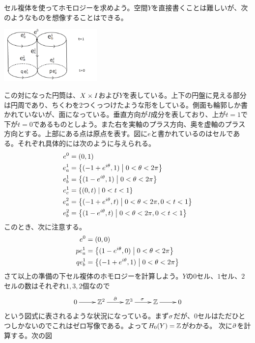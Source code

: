 \subsubsection{} %
\begin{sol}

セル複体を使ってホモロジーを求めよう。空間$Y$を直接書くことは難しいが、次のようなものを想像することはできる。

\begin{center}
\includegraphics[width=5cm]{H31expert05_01.png}
\end{center}

この対になった円筒は、$X \times I$および$Y$を表している。上下の円盤に見える部分は円周であり、ちくわを2つくっつけたような形をしている。側面も輪郭しか書かれていないが、面になっている。垂直方向が$I$成分を表しており、上が$t=1$で下が$t=0$であるものとしよう。また右を実軸のプラス方向、奥を虚軸のプラス方向とする。上部にある点は原点を表す。図に$e$と書かれているのはセルである。それぞれ具体的には次のように与えられる。
\begin{align*}
  e^0 &= (0,1) \\
  e^1_a &= \left\{  (-1+e^{i{\theta}},1)  \mathrel{} \middle| \mathrel{} 0 < {\theta} < 2\pi  \right\} \\
  e^1_b &= \left\{  (1-e^{i{\theta}},1)  \mathrel{} \middle| \mathrel{} 0 < {\theta} < 2\pi  \right\} \\
  e^1_c &= \left\{  (0,t)  \mathrel{} \middle| \mathrel{} 0 < t < 1  \right\} \\
  e^2_a &= \left\{  (-1+e^{i{\theta}},t)  \mathrel{} \middle| \mathrel{} 0 < {\theta} < 2\pi , 0 < t < 1  \right\} \\
  e^2_b &= \left\{  (1-e^{i{\theta}},t)  \mathrel{} \middle| \mathrel{} 0 < {\theta} < 2\pi , 0 < t < 1  \right\}
\end{align*}
このとき、次に注意する。
\begin{align*}
  e^0 &= (0,0) \\
  pe_a^1 &= \left\{  (1-e^{i{\theta}},0)  \mathrel{} \middle| \mathrel{} 0 < {\theta} < 2\pi  \right\} \\
  qe_b^1 &= \left\{  (-1+e^{i{\theta}},1)  \mathrel{} \middle| \mathrel{} 0 < {\theta} < 2\pi  \right\}
\end{align*}
さて以上の準備の下セル複体のホモロジーを計算しよう。$Y$の$0$セル、$1$セル、$2$セルの数はそれぞれ$1,3,2$個なので
\[
\xymatrix{
0 \ar[r] & \Z^2 \ar[r]^{\del} & \Z^3 \ar[r]^{\grs} & \Z \ar[r] & 0
}
\]
という図式に表されるような状況になっている。まず${\sigma}$だが、$0$セルはただひとつしかないのでこれはゼロ写像である。よって$H_0(Y)={\mathbb Z}$がわかる。
次に$\partial$を計算する。次の図


\end{sol}
